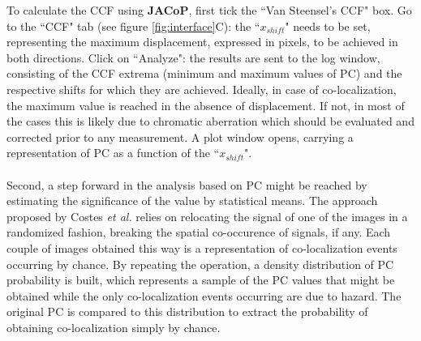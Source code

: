 \documentclass[]{spie}  %
\begin{document}
To calculate the CCF using \textbf{JACoP}, first tick the ``Van Steensel's CCF" box. Go to the ``CCF" tab (see figure \ref{fig:interface}C): the ``$x_{shift}$" needs to be set, representing the maximum displacement, expressed in pixels, to be achieved in both directions. Click on ``Analyze": the results are sent to the log window, consisting of the CCF extrema (minimum and maximum values of PC) and the respective shifts for which they are achieved. Ideally, in case of co-localization, the maximum value is reached in the absence of displacement. If not, in most of the cases this is likely due to chromatic aberration which should be evaluated and corrected prior to any measurement. A plot window opens, carrying a representation of PC as a function of the ``$x_{shift}$".\\\\
Second, a step forward in the analysis based on PC might be reached by estimating the significance of the value by statistical means. The approach proposed by Costes \textit{et al.}\cite{Costes2004} relies on relocating the signal of one of the images in a randomized fashion, breaking the spatial co-occurence of signals, if any. Each couple of images obtained this way is a representation of co-localization events occurring by chance. By repeating the operation, a density distribution of PC probability is built, which represents a sample of the PC values that might be obtained while the only co-localization events occurring are due to hazard. The original PC is compared to this distribution to extract the probability of obtaining co-localization simply by chance.\\\\
\end{document}
